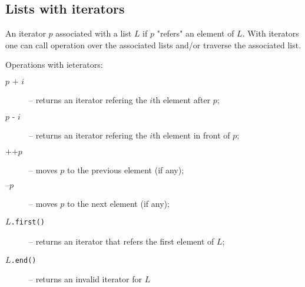 \documentclass[a4paper]{report}
\begin{document}

\subsection{Lists with iterators}

An iterator $p$ associated with a list $L$ if $p$ "refers" an element of $L$. With iterators one can call operation over the associated lists and/or traverse the associated list.

Operations with ieterators:
\begin{description}
\item[$p\texttt{ + }i$] -- returns an iterator refering the $i$th element after $p$;
\item[$p\texttt{ - }i$] -- returns an iterator refering the $i$th element in front of $p$;
\item[$\texttt{++}p$] -- moves $p$ to the previous element (if any);
\item[$\texttt{--}p$]  -- moves $p$ to the next element (if any);
\item[$L$\texttt{.first()}] -- returns an iterator that refers the first element of $L$;
\item[$L$\texttt{.end()}] -- returns an invalid iterator for $L$
\end{description}
\end{document}
